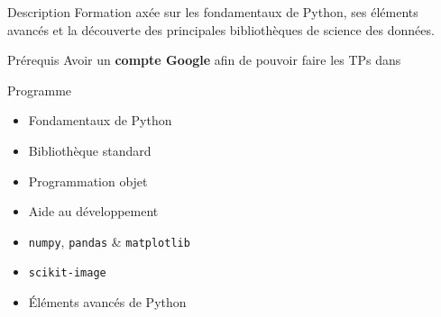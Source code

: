 \begin{frame}{Description}
  Formation axée sur les fondamentaux de Python, ses éléments avancés et la découverte des principales bibliothèques de science des données.
\end{frame}

\begin{frame}{Prérequis}
  Avoir un \textbf{compte Google} afin de pouvoir faire les TPs dans 
\end{frame}

\begin{frame}{Programme}
  \begin{itemize}
    \item Fondamentaux de Python
    \item Bibliothèque standard
    \item Programmation objet
    \item Aide au développement
    \item \texttt{numpy}, \texttt{pandas} \& \texttt{matplotlib}
    \item \texttt{scikit-image}
    \item Éléments avancés de Python
  \end{itemize}
\end{frame}

